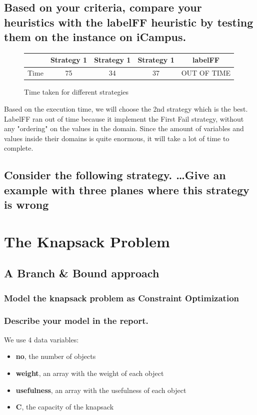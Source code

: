 \documentclass[a4paper ,12pt,french]{article}
\begin{document}
\subsection{Based on your criteria, compare your heuristics with the labelFF heuristic by testing them on the instance on iCampus.}
\begin{figure}[!h]
\begin{tabular}{|c|c|c|c|c|}
\hline
&Strategy 1&Strategy 1&Strategy 1&labelFF\\
\hline
Time&75&34&37&OUT OF TIME\\
\hline
\end{tabular}
\caption{Time taken for different strategies}
\label{Airport}
\end{figure}
Based on the execution time, we will choose the 2nd strategy which is the best. LabelFF ran out of time because it implement the First Fail strategy, without any "ordering" on the values in the domain. Since the amount of variables and values inside their domains is quite enormous, it will take a lot of time to complete.

\subsection{Consider the following strategy. \dots Give an example with three planes where this strategy is wrong}


\section{The Knapsack Problem}

\subsection{A Branch \& Bound approach}

\subsubsection{Model the knapsack problem as Constraint Optimization}


\subsubsection{Describe your model in the report.}

We use 4 data variables: 
\begin{itemize}
\item \textbf{no}, the number of objects
\item \textbf{weight}, an array with the weight of each object
\item \textbf{usefulness}, an array with the usefulness of each object
\item \textbf{C}, the capacity of the knapsack\\
\end{itemize}
\end{document}
